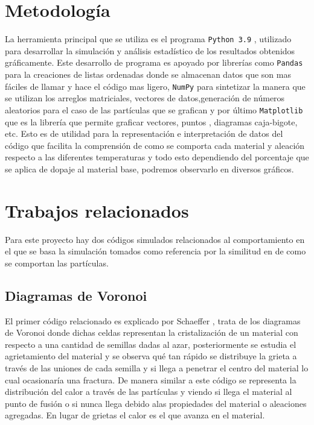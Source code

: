\documentclass[3pt,twocolumn]{elsarticle}
\begin{document}
\section{Metodología}
La herramienta principal que se utiliza es el programa \texttt{Python 3.9} \cite{Python}, utilizado para desarrollar la simulación y análisis estadístico de los resultados obtenidos gráficamente.
Este desarrollo de programa es apoyado por librerías como \texttt{Pandas} \cite{pandas} para la creaciones de listas ordenadas donde se almacenan datos que son mas fáciles de llamar y hace el código mas ligero, \texttt{NumPy} \cite{numpy} para sintetizar la manera que se utilizan los arreglos matriciales, vectores de datos,generación de números aleatorios para el caso de las partículas que se grafican y por último \texttt{Matplotlib} \cite{matplot} que es la librería que permite graficar vectores, puntos , diagramas caja-bigote, etc. Esto es de utilidad para la representación e interpretación de datos del código que facilita la comprensión de como se comporta cada material y aleación respecto a las diferentes temperaturas y todo esto dependiendo del porcentaje que se aplica de dopaje al material base, podremos observarlo en diversos gráficos.

\section{Trabajos relacionados}\label{intr}
Para este proyecto hay dos códigos simulados relacionados al comportamiento en el que se basa la simulación tomados como referencia por la similitud en de como se comportan las partículas.
\subsection{Diagramas de Voronoi}
El primer código relacionado es explicado por Schaeffer \cite{DV}, trata de los diagramas de Voronoi donde dichas celdas representan la cristalización de un material con respecto a una cantidad de semillas dadas al azar, posteriormente se estudia el agrietamiento del material y se observa qué tan rápido se distribuye la grieta a través de las uniones de cada semilla y si llega a penetrar el centro del material lo cual ocasionaría una fractura. De manera similar a este código se representa la distribución del calor a través de las partículas y viendo si llega el material al punto de fusión o si nunca llega debido alas propiedades del material o aleaciones agregadas. En lugar de grietas el calor es el que avanza en el material. 
\end{document}
